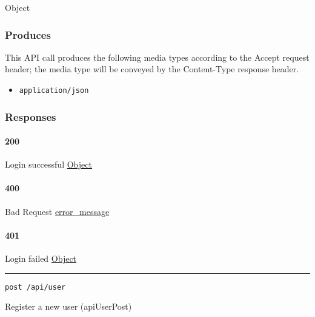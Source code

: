 Object

\hypertarget{produces-144}{%
\subsubsection{Produces}\label{produces-144}}

This API call produces the following media types according to the
{Accept} request header; the media type will be conveyed by the
{Content-Type} response header.

\begin{itemize}
\tightlist
\item
  \texttt{application/json}
\end{itemize}

\hypertarget{responses-149}{%
\subsubsection{Responses}\label{responses-149}}

\hypertarget{section-479}{%
\paragraph{200}\label{section-479}}

Login successful \protect\hyperlink{Object}{Object}

\hypertarget{section-480}{%
\paragraph{400}\label{section-480}}

Bad Request \protect\hyperlink{error_message}{error\_message}

\hypertarget{section-481}{%
\paragraph{401}\label{section-481}}

Login failed \protect\hyperlink{Object}{Object}

\begin{center}\rule{0.5\linewidth}{\linethickness}\end{center}

\protect\hypertarget{apiUserPost}{}{}

\begin{verbatim}
post /api/user
\end{verbatim}

Register a new user ({apiUserPost})

